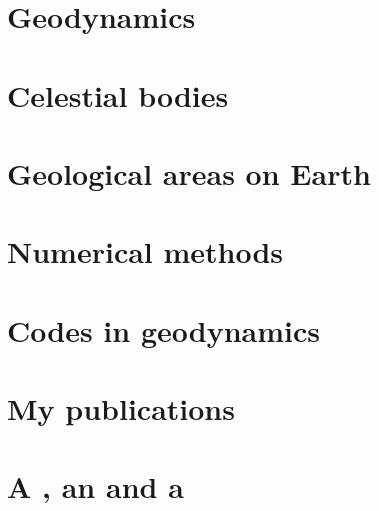 \documentclass[a4paper,12pt]{report}
\begin{document}
\chapter{Geodynamics} 

\chapter{Celestial bodies} 

\chapter{Geological areas on Earth} 

\chapter{Numerical methods} 

\chapter{Codes in geodynamics } 

\chapter{My publications} 

\chapter{A \fantom, an \elefant and a \ghost} 

\printbibliography
\end{document}
